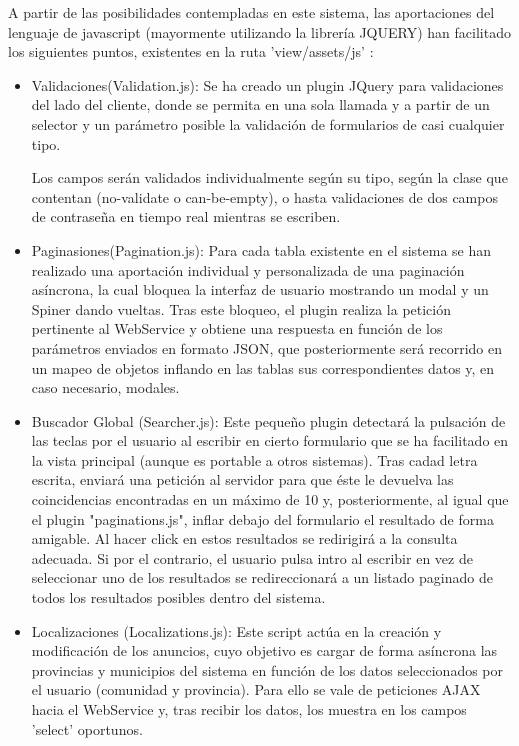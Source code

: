 A partir de las posibilidades contempladas en este sistema, las aportaciones del lenguaje de javascript (mayormente utilizando la librer\'{i}a JQUERY)
han facilitado los siguientes puntos, existentes en la ruta 'view/assets/js' :
\begin{itemize}


\item Validaciones(Validation.js): Se ha creado un plugin JQuery para validaciones del lado del cliente, donde se permita en una sola llamada
y a partir de un selector y un par\'{a}metro posible la validaci\'{o}n de formularios de casi cualquier tipo.

Los campos ser\'{a}n validados individualmente seg\'{u}n su tipo, seg\'{u}n la clase que contentan (no-validate o can-be-empty), 
o hasta validaciones de dos campos de contrase\~{n}a en tiempo real mientras se escriben.

\item Paginasiones(Pagination.js): Para cada tabla existente en el sistema se han realizado una aportaci\'{o}n individual y personalizada
de una paginaci\'{o}n as\'{i}ncrona, la cual bloquea la interfaz de usuario mostrando un modal y un Spiner dando vueltas.
Tras este bloqueo, el plugin realiza la petici\'{o}n pertinente al WebService y obtiene una respuesta en funci\'{o}n
de los par\'{a}metros enviados en formato JSON, que posteriormente ser\'{a} recorrido en un mapeo de objetos inflando
en las tablas sus correspondientes datos y, en caso necesario, modales.

\item Buscador Global (Searcher.js): Este peque\~{n}o plugin detectar\'{a} la pulsaci\'{o}n de las teclas por el usuario 
al escribir en cierto formulario que se ha facilitado en la vista principal (aunque es portable a otros sistemas).
Tras cadad letra escrita, enviar\'{a} una petici\'{o}n al servidor para que \'{e}ste le devuelva las coincidencias encontradas 
en un m\'{a}ximo de 10 y, posteriormente, al igual que el plugin "paginations.js", inflar debajo del formulario el resultado
de forma amigable. Al hacer click en estos resultados se redirigir\'{a} a la consulta adecuada. Si por el contrario, el usuario
pulsa intro al escribir en vez de seleccionar uno de los resultados se redireccionar\'{a} a un listado paginado de todos los resultados
posibles dentro del sistema.


\item Localizaciones (Localizations.js): Este script act\'{u}a en la creaci\'{o}n y modificaci\'{o}n de los anuncios,
cuyo objetivo es cargar de forma as\'{i}ncrona las provincias y municipios del sistema en funci\'{o}n de los datos
seleccionados por el usuario (comunidad y provincia). Para ello se vale de peticiones AJAX hacia el WebService 
y, tras recibir los datos, los muestra en los campos 'select' oportunos.



\end{itemize}
